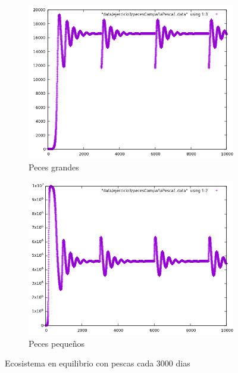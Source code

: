 \documentclass[12pt,a4paper]{article}
\begin{document}
\begin{figure}[H]
	\centering
	\begin{subfigure}{.5\textwidth}
		\centering
		\includegraphics[width=1\linewidth]{./images/pesca1Grandes.png}
		\caption{Peces grandes}
		\label{fig:subPecesGrandes2}
	\end{subfigure}%
	\begin{subfigure}{.5\textwidth}
		\centering
		\includegraphics[width=1\linewidth]{./images/pesca1Peque.png}
		\caption{Peces pequeños}
		\label{fig:subPecesPeque2}
	\end{subfigure}
	\caption{Ecosistema en equilibrio con pescas cada 3000 dias}
	\label{fig:ecosistema2}
\end{figure}
\end{document}

